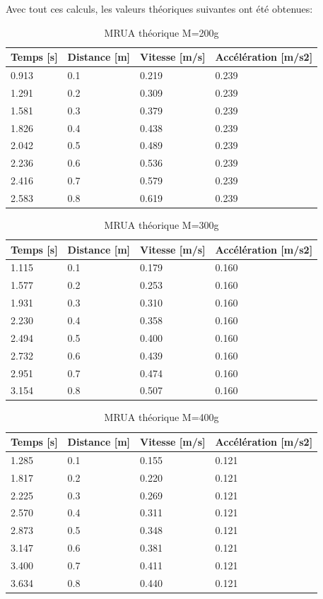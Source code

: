 \newpage

Avec tout ces calculs, les valeurs théoriques suivantes ont été obtenues:

\begin{table}[ht]
    \centering
    \caption[MRUA théorique M=200g]{MRUA théorique M=200g}
    \begin{tabular}{|l|l|l|l|}
	\hline
	Temps [s]	&Distance [m]	&Vitesse [m/s]	&Accélération [m/s2]\\
	\hline
	0.913	&0.1	&0.219	&0.239 \\
	1.291	&0.2	&0.309	&0.239 \\
	1.581	&0.3	&0.379	&0.239 \\
	1.826	&0.4	&0.438	&0.239 \\
	2.042	&0.5	&0.489	&0.239 \\
	2.236	&0.6	&0.536	&0.239 \\
	2.416	&0.7	&0.579	&0.239 \\
	2.583	&0.8	&0.619	&0.239 \\
	\hline
    \end{tabular}
\end{table}

\begin{table}[ht]
    \centering
    \caption[MRUA théorique M=300g]{MRUA théorique M=300g}
    \begin{tabular}{|l|l|l|l|}
	\hline
	Temps [s]	&Distance [m]	&Vitesse [m/s]	&Accélération [m/s2]\\
	\hline
	1.115	&0.1	&0.179	&0.160 \\
	1.577	&0.2	&0.253	&0.160 \\
	1.931	&0.3	&0.310	&0.160 \\
	2.230	&0.4	&0.358	&0.160 \\
	2.494	&0.5	&0.400	&0.160 \\
	2.732	&0.6	&0.439	&0.160 \\
	2.951	&0.7	&0.474	&0.160 \\
	3.154	&0.8	&0.507	&0.160 \\
	\hline
    \end{tabular}
\end{table}

\begin{table}[ht]
    \centering
    \caption[MRUA théorique M=400g]{MRUA théorique M=400g}
    \begin{tabular}{|l|l|l|l|}
	\hline
	Temps [s]	&Distance [m]	&Vitesse [m/s]	&Accélération [m/s2]\\
	\hline
	1.285	&0.1	&0.155	&0.121\\
	1.817	&0.2	&0.220	&0.121\\
	2.225	&0.3	&0.269	&0.121\\
	2.570	&0.4	&0.311	&0.121\\
	2.873	&0.5	&0.348	&0.121\\
	3.147	&0.6	&0.381	&0.121\\
	3.400	&0.7	&0.411	&0.121\\
	3.634	&0.8	&0.440	&0.121\\
	\hline
    \end{tabular}
\end{table}

